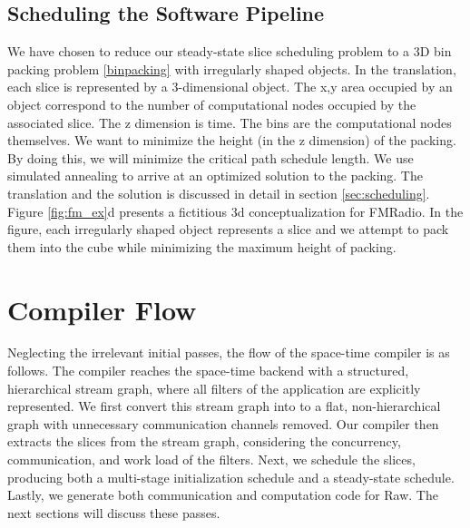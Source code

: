 \subsection{Scheduling the Software Pipeline}
We have chosen to reduce our steady-state slice scheduling problem to
a 3D bin packing problem \ref{binpacking} with irregularly shaped
objects.  In the translation, each slice is represented by a
3-dimensional object.  The x,y area occupied by an object correspond
to the number of computational nodes occupied by the associated
slice. The z dimension is time.  The bins are the computational nodes
themselves.  We want to minimize the height (in the z dimension) of
the packing.  By doing this, we will minimize the critical path
schedule length.  We use simulated annealing to arrive at an optimized
solution to the packing.  The translation and the solution is
discussed in detail in section \ref{sec:scheduling}. Figure
\ref{fig:fm_ex}d presents a fictitious 3d conceptualization for
FMRadio. In the figure, each irregularly shaped object represents a
slice and we attempt to pack them into the cube while minimizing the
maximum height of packing.

\section{Compiler Flow}
Neglecting the irrelevant initial passes, the flow of the space-time
compiler is as follows.  The compiler reaches the space-time backend
with a structured, hierarchical stream graph, where all filters of the
application are explicitly represented.  We first convert this stream
graph into to a flat, non-hierarchical graph with unnecessary
communication channels removed.  Our compiler then extracts the
slices from the stream graph, considering the concurrency,
communication, and work load of the filters.
Next, we schedule the slices, producing both a multi-stage
initialization schedule and a steady-state schedule.  Lastly, we
generate both communication and computation code for Raw.  The next
sections will discuss these passes.
